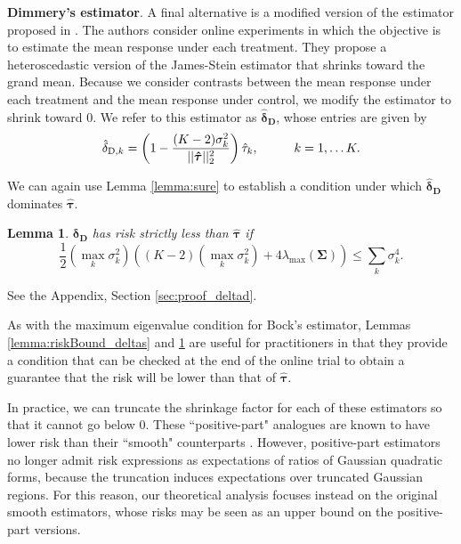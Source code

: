 \documentclass{article}
\newcommand{\bstau}{\boldsymbol \tau}
\newcommand{\hbstau}{\boldsymbol{\hat \tau}}
\newcommand{\bsSig}{\boldsymbol  \Sigma}
\newcommand{\bsdeltad}{\boldsymbol{\hat \delta_{\textbf{D}}}}
\newcommand{\btaujs}{\boldsymbol \delta_{\textbf{D}}}
\newtheorem{lemma}{Lemma}
\newenvironment{proof*}
  {\renewcommand{\qedsymbol}{}\proof}
  {\endproof}
\newcommand{\lambdamax}{\lambda_{\text{max}}(\bsSig)}
\begin{document}
\textbf{Dimmery's estimator}. A final alternative is a modified version of the estimator proposed in \cite{dimmery2019shrinkage}. The authors consider %
online experiments in which the objective is to estimate the mean response under each treatment. They propose a heteroscedastic version of the James-Stein estimator that shrinks toward the grand mean. Because we consider contrasts between the mean response under each treatment and the mean response under control, we modify the estimator to shrink toward 0. We refer to this estimator as $\bsdeltad$, whose entries are given by 
\[ \hat \delta_{\text{D}, k} = \left(1 - \frac{(K - 2) \sigma_k^2}{|| \hbstau ||_2^2} \right) \hat \tau_k, \hspace{10mm} k = 1, \dots K. \] 
 
\noindent We can  again use Lemma \ref{lemma:sure} to establish a condition under which $\bsdeltad$ dominates $\hbstau$.


\begin{lemma}\label{lemma:riskBound_deltad}
$\btaujs$ has risk strictly less than $\hbstau$ if
\begin{equation}\label{eq:domCondition}
\frac{1}{2} \left( \max_k \sigma_k^2 \right) \left( (K - 2) (\max_k \sigma_k^2) + 4 \lambdamax  \right) \leq \sum_k \sigma_k^4.
\end{equation}
\end{lemma}

\begin{proof*}
See the Appendix, Section \ref{sec:proof_deltad}. 
\end{proof*}

\noindent As with the maximum eigenvalue condition for Bock's estimator, Lemmas \ref{lemma:riskBound_deltas} and  \ref{lemma:riskBound_deltad} are useful for practitioners in that they provide a condition that can be checked at the end of the online trial to obtain a guarantee that the risk will be lower than that of $\hbstau$. 

In practice, we can truncate the shrinkage factor for each of these estimators so that it cannot go below $0$. These ``positive-part" analogues are known to have lower risk than their ``smooth" counterparts \citep{baranchik1964multiple}. However, positive-part estimators no longer admit risk expressions as expectations of ratios of Gaussian quadratic forms, because the truncation induces expectations over truncated Gaussian regions. For this reason, our theoretical analysis focuses instead on the original smooth estimators, whose risks may be seen as an upper bound on the positive-part versions. 
\end{document}
